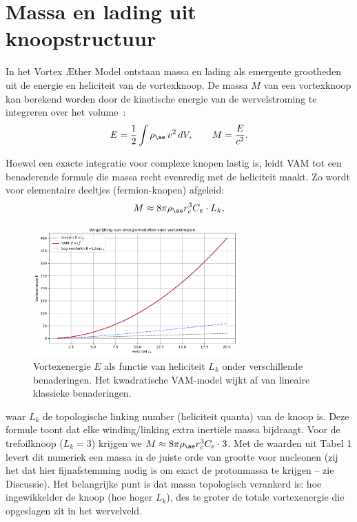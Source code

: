 \section{Massa en lading uit knoopstructuur}

In het Vortex Æther Model ontstaan massa en lading als emergente grootheden uit de energie en heliciteit van de vortexknoop. De massa $M$ van een
vortexknoop kan berekend worden door de kinetische energie van de wervelstroming te integreren over het volume~\cite{Moffatt1990VortexHelicity}:
\begin{equation}
    E = \frac{1}{2}\int \rho_{\ae}\, v^2 \,dV, \qquad M = \frac{E}{c^2}.
\end{equation}

Hoewel een exacte integratie voor complexe knopen lastig is, leidt VAM tot een benaderende formule die massa recht evenredig met de heliciteit maakt. Zo wordt voor elementaire deeltjes (fermion-knopen) afgeleid:
\begin{equation}
    M \approx 8\pi \rho_{\ae} r_c^3 C_e \cdot L_k,
\end{equation}


\begin{figure}[H]
    \centering
    \includegraphics[width=0.7\textwidth]{sections/5_Wervelveldenergie}
    \caption{Vortexenergie $E$ als functie van heliciteit $L_k$ onder verschillende benaderingen. Het kwadratische VAM-model wijkt af van lineaire klassieke benaderingen.}
    \label{fig:energie_vs_heliciteit}
\end{figure}

waar $L_k$ de topologische linking number (heliciteit quanta) van de knoop is. Deze formule toont dat elke winding/linking extra inertiële massa bijdraagt. Voor de trefoilknoop ($L_k=3$) krijgen we $M \approx 8\pi \rho_{\ae} r_c^3 C_e \cdot 3$. Met de waarden uit Tabel 1 levert dit numeriek een massa in de juiste orde van grootte voor nucleonen (zij het dat hier fijnafstemming nodig is om exact de protonmassa te krijgen – zie Discussie). Het belangrijke punt is dat massa topologisch verankerd is: hoe ingewikkelder de knoop (hoe hoger $L_k$), des te groter de totale vortexenergie die opgeslagen zit in het wervelveld.

